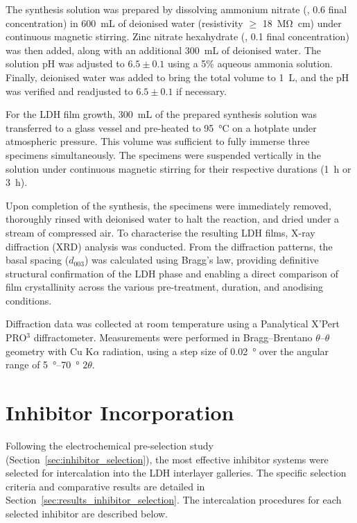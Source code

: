 \documentclass[11pt,twoside,a4paper,final]{report}
\begin{document}
The synthesis solution was prepared by dissolving ammonium nitrate (, \qty{0.6}{\molar} final concentration) in \qty{600}{\milli\liter} of deionised water (resistivity $\geq$ \qty{18}{\mega\ohm\centi\meter}) under continuous magnetic stirring. Zinc nitrate hexahydrate (, \qty{0.1}{\molar} final concentration) was then added, along with an additional \qty{300}{\milli\liter} of deionised water. The solution pH was adjusted to $6.5 \pm 0.1$ using a 5\% aqueous ammonia solution. Finally, deionised water was added to bring the total volume to \qty{1}{\liter}, and the pH was verified and readjusted to $6.5 \pm 0.1$ if necessary.

For the LDH film growth, \qty{300}{\milli\liter} of the prepared synthesis solution was transferred to a glass vessel and pre-heated to \qty{95}{\degreeCelsius} on a hotplate under atmospheric pressure. This volume was sufficient to fully immerse three specimens simultaneously. The specimens were suspended vertically in the solution under continuous magnetic stirring for their respective durations (\qty{1}{\hour} or \qty{3}{\hour}). 

Upon completion of the synthesis, the specimens were immediately removed, thoroughly rinsed with deionised water to halt the reaction, and dried under a stream of compressed air. To characterise the resulting LDH films, X-ray diffraction (XRD) analysis was conducted. From the diffraction patterns, the basal spacing ($d_{003}$) was calculated using Bragg's law, providing definitive structural confirmation of the LDH phase and enabling a direct comparison of film crystallinity across the various pre-treatment, duration, and anodising conditions.

Diffraction data was collected at room temperature using a Panalytical X'Pert PRO$^3$ diffractometer. Measurements were performed in Bragg--Brentano $\theta$--$\theta$ geometry with Cu K$\alpha$ radiation, using a step size of \qty{0.02}{\degree} over the angular range of \qtyrange{5}{70}{\degree} $2\theta$.

\section{Inhibitor Incorporation}
\label{sec:inhibitor_incorporation}

Following the electrochemical pre-selection study (Section~\ref{sec:inhibitor_selection}), the most effective inhibitor systems were selected for intercalation into the LDH interlayer galleries. The specific selection criteria and comparative results are detailed in Section~\ref{sec:results_inhibitor_selection}. The intercalation procedures for each selected inhibitor are described below.
\end{document}
